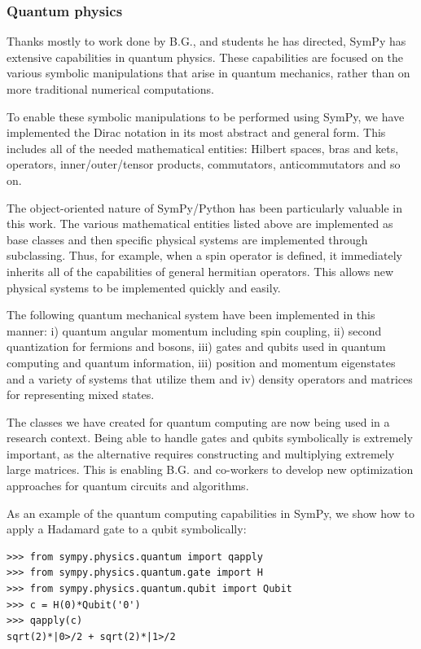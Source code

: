 \documentclass[12pt]{article}
\def\BG{B.G.}
\begin{document}
\subsubsection{Quantum physics}

Thanks mostly to work done by \BG, and students he has directed, SymPy
has extensive capabilities in quantum physics.  These capabilities are focused
on the various symbolic manipulations that arise in quantum mechanics,
rather than on more traditional numerical computations.

To enable these symbolic manipulations to be performed using SymPy, we have
implemented the Dirac notation in its most abstract and general form. This includes
all of the needed mathematical entities: Hilbert spaces, bras and kets, operators,
inner/outer/tensor products, commutators, anticommutators and so on.

The object-oriented nature of SymPy/Python has been particularly valuable in
this work.  The various mathematical entities listed above are implemented
as base classes and then specific physical systems are implemented through
subclassing.  Thus, for example, when a spin operator is defined, it immediately
inherits all of the capabilities of general hermitian operators.  This allows new physical
systems to be implemented quickly and easily.

The following quantum mechanical system have been implemented in this manner:
i) quantum angular momentum including spin coupling, ii) second quantization for
fermions and bosons, iii) gates and qubits used in quantum computing and quantum
information, iii) position and momentum eigenstates and a variety of systems that
utilize them and iv) density operators and matrices for representing mixed states.

The classes we have created for quantum computing are now being used
in a research context. Being able to handle gates and qubits symbolically
is extremely important, as the alternative requires constructing and multiplying
extremely large matrices. This is enabling \BG{} and co-workers to develop new
optimization approaches for quantum circuits and algorithms.

As an example of the quantum computing capabilities in SymPy, we show how to
apply a Hadamard gate to a qubit symbolically:

\begin{Verbatim}[fontsize=\scriptsize,fontfamily=courier,fontshape=tt,frame=single,label=SymPy]
>>> from sympy.physics.quantum import qapply
>>> from sympy.physics.quantum.gate import H
>>> from sympy.physics.quantum.qubit import Qubit
>>> c = H(0)*Qubit('0')
>>> qapply(c)
sqrt(2)*|0>/2 + sqrt(2)*|1>/2
\end{Verbatim}
\end{document}
